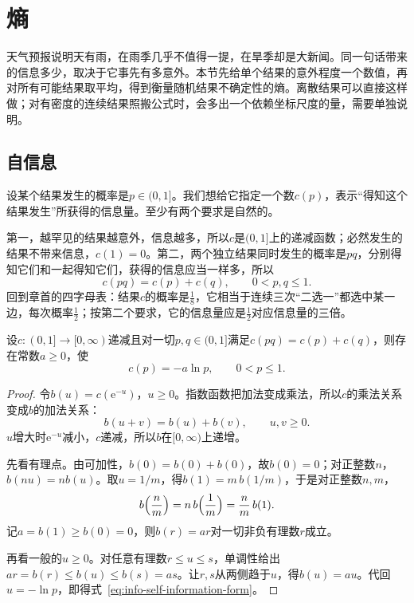 \section{熵}
\label{sec:info-entropy}

天气预报说明天有雨，在雨季几乎不值得一提，在旱季却是大新闻。同一句话带来的信息多少，取决于它事先有多意外。本节先给单个结果的意外程度一个数值，再对所有可能结果取平均，得到衡量随机结果不确定性的熵。离散结果可以直接这样做；对有密度的连续结果照搬公式时，会多出一个依赖坐标尺度的量，需要单独说明。

\subsection{自信息}
\label{sec:info-self-information}

设某个结果发生的概率是$p\in(0,1]$。我们想给它指定一个数$c(p)$，表示“得知这个结果发生”所获得的信息量。至少有两个要求是自然的。

第一，越罕见的结果越意外，信息越多，所以$c$是$(0,1]$上的递减函数；必然发生的结果不带来信息，$c(1)=0$。第二，两个独立结果同时发生的概率是$pq$，分别得知它们和一起得知它们，获得的信息应当一样多，所以
\[
  c(pq)=c(p)+c(q),\qquad 0<p,q\leq1.
\]
回到章首的四字母表：结果$c$的概率是$\tfrac18$，它相当于连续三次“二选一”都选中某一边，每次概率$\tfrac12$；按第二个要求，它的信息量应是$\tfrac12$对应信息量的三倍。

\begin{theorem}[自信息的形式]
\label{thm:info-self-information-form}
设$c:(0,1]\to[0,\infty)$递减且对一切$p,q\in(0,1]$满足$c(pq)=c(p)+c(q)$，则存在常数$a\geq0$，使
\begin{equation}
  c(p)=-a\ln p,\qquad 0<p\leq1.
  \label{eq:info-self-information-form}
\end{equation}
\end{theorem}

\begin{proof}
令$b(u)=c(\mathrm{e}^{-u})$，$u\geq0$。指数函数把加法变成乘法，所以$c$的乘法关系变成$b$的加法关系：
\[
  b(u+v)=b(u)+b(v),\qquad u,v\geq0.
\]
$u$增大时$\mathrm{e}^{-u}$减小，$c$递减，所以$b$在$[0,\infty)$上递增。

先看有理点。由可加性，$b(0)=b(0)+b(0)$，故$b(0)=0$；对正整数$n$，$b(nu)=nb(u)$。取$u=1/m$，得$b(1)=m\,b(1/m)$，于是对正整数$n,m$，
\[
  b\Bigl(\frac{n}{m}\Bigr)=n\,b\Bigl(\frac1m\Bigr)=\frac{n}{m}\,b(1).
\]
记$a=b(1)\geq b(0)=0$，则$b(r)=ar$对一切非负有理数$r$成立。

再看一般的$u\geq0$。对任意有理数$r\leq u\leq s$，单调性给出$ar=b(r)\leq b(u)\leq b(s)=as$。让$r,s$从两侧趋于$u$，得$b(u)=au$。代回$u=-\ln p$，即得式~\eqref{eq:info-self-information-form}。
\end{proof}

